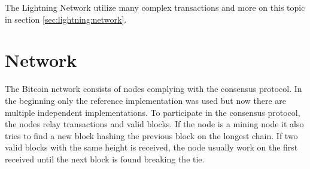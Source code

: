 The Lightning Network utilize many complex transactions and more on this topic in section \ref{sec:lightning:network}.

\section{Network}

The Bitcoin network consists of nodes complying with the consensus protocol. In the beginning only the reference implementation was used but now there are multiple independent implementations\cite{repository:bitcoin}\cite{repository:btcd}\cite{repository:neutrino}. To participate in the consensus protocol, the nodes relay transactions and valid blocks. If the node is a mining node it also tries to find a new block hashing the previous block on the longest chain. If two valid blocks with the same height is received, the node usually work on the first received until the next block is found breaking the tie. 


